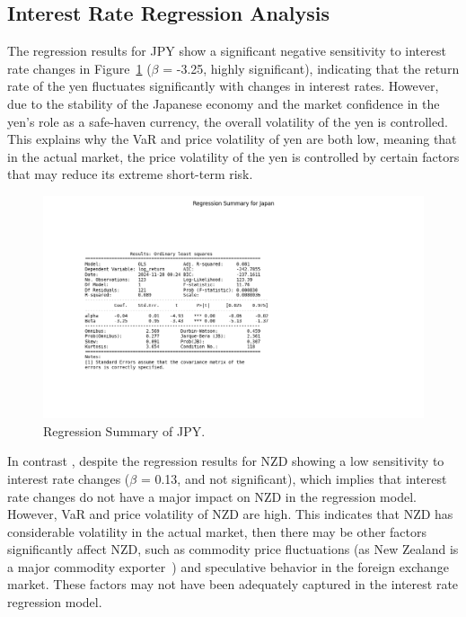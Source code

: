 \documentclass{article}
\begin{document}
\subsection{Interest Rate Regression Analysis}
The regression results for JPY show a significant negative sensitivity to interest rate changes in Figure~\ref{fig:regression_summary_Japan} ($\beta$ = -3.25, highly significant), indicating that the return rate of the yen fluctuates significantly with changes in interest rates. However, due to the stability of the Japanese economy and the market confidence in the yen's role as a safe-haven currency, the overall volatility of the yen is controlled. This explains why the VaR and price volatility of yen are both low, meaning that in the actual market, the price volatility of the yen is controlled by certain factors that may reduce its extreme short-term risk.

\begin{figure}[h]
    \centering  \includegraphics[width=0.75\linewidth]{reports/figures/regression_summary_Japan.png}
    \caption{Regression Summary of JPY.}
    \label{fig:regression_summary_Japan}
\end{figure}

In contrast , despite the regression results for NZD showing a low sensitivity to interest rate changes ($\beta$ = 0.13, and not significant), which implies that interest rate changes do not have a major impact on NZD in the regression model. However, VaR and price volatility of NZD are high. This indicates that NZD has considerable volatility in the actual market, then there may be other factors significantly affect NZD, such as commodity price fluctuations (as New Zealand is a major commodity exporter~\cite{blundell1990exchange}) and speculative behavior in the foreign exchange market. These factors may not have been adequately captured in the interest rate regression model.
\end{document}
